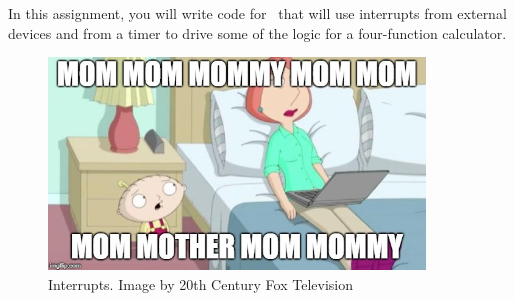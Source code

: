 


\usepackage{graphicx}
\usepackage{addfont}
\usepackage{wrapfig}
\usepackage{enumitem}

\renewcommand{\labnumber}{\capstonelabnumber}
\renewcommand{\labname}{Using Interrupt-Driven Input/Output}
\renewcommand{\shortlabname}{interrupt-driven i/o -- calculatorlab}
\renewcommand{\collaborationrules}{\capstonelabcollaboration}
\renewcommand{\duedate}{\capstonelabdue}
\newcommand{\nano}{\developmentboard} %
\renewcommand{\runtimeenvironment}{\capstonelabenvironment}
\pagelayout

\labidentifier

In this assignment, you will write code for \runtimeenvironment\ that will use
interrupts from external devices and from a timer to drive some of the logic
for a four-function calculator.

\begin{figure}[h]
    \centering
    \includegraphics[width=10cm]{MomMomMom}
    \caption{Interrupts. \tiny Image by 20th Century Fox Television}
\end{figure}

